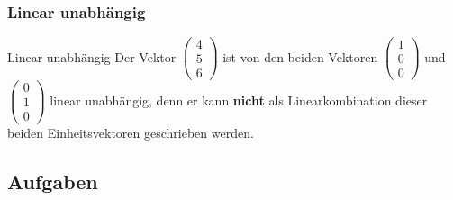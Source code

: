 \subsubsection{Linear unabhängig}
\begin{bemerkung}{Linear unabhängig}{}
  Der Vektor $\begin{pmatrix}4\\5\\6\end{pmatrix}$ ist von den beiden
    Vektoren $\begin{pmatrix}1\\0\\0\end{pmatrix}$ 
    und $\begin{pmatrix}0\\1\\0\end{pmatrix}$  linear unabhängig, denn
      er kann \textbf{nicht} als Linearkombination dieser beiden
      Einheitsvektoren geschrieben werden.
\end{bemerkung}

\subsection*{Aufgaben}
